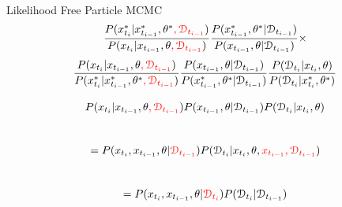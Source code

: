 \documentclass[12pt,a4paper,t,xcolor=dvipsnames,slidestop,compress,mathserif]{beamer}
\newcommand{\red}[1]{{\color{red}#1}}
\begin{document}
\begin{frame}{Likelihood Free Particle MCMC}
$$ \frac{P(x_{t_{i}}^*| x_{t_{i-1}}^*,\theta^*\red{, \mathcal{D}_{t_{i-1}}})}{P(x_{t_{i}}| x_{t_{i-1}}, \theta \red{, \mathcal{D}_{t_{i-1}}})} 
\frac{P(x_{t_{i-1}}^*,\theta^*| \mathcal{D}_{t_{i-1}})}{P(x_{t_{i-1}}, \theta| \mathcal{D}_{t_{i-1}})}
\times $$
$$\frac{P(x_{t_{i}}| x_{t_{i-1}}, \theta \red{, \mathcal{D}_{t_{i-1}}})}{P(x_{t_{i}}^*| x_{t_{i-1}}^*,\theta^*\red{, \mathcal{D}_{t_{i-1}}})}
\frac{ P(x_{t_{i-1}}, \theta| \mathcal{D}_{t_{i-1}})}{ P( x_{t_{i-1}}^*,\theta^*| \mathcal{D}_{t_{i-1}})}   
\frac{P(\mathcal{D}_{t_{i}}|x_{t_{i}}, \theta)}{P(\mathcal{D}_{t_{i}}|x_{t_{i}}^*, \theta^*)}$$  
\pause

$${P(x_{t_{i}}| x_{t_{i-1}}, \theta \red{, \mathcal{D}_{t_{i-1}}})}
{ P(x_{t_{i-1}}, \theta| \mathcal{D}_{t_{i-1}})}
{P(\mathcal{D}_{t_{i}}|x_{t_{i}}, \theta)}$$ \\
\pause
$$={P(x_{t_{i}}, x_{t_{i-1}}, \theta |\red{ \mathcal{D}_{t_{i-1}}})}
{P(\mathcal{D}_{t_{i}}|x_{t_{i}}, \theta, \red{ x_{t_{i-1}},\mathcal{D}_{t_{i-1}}})}$$ \\

$$={P(x_{t_{i}}, x_{t_{i-1}}, \theta |\red{ \mathcal{D}_{t_{i}}})P( \mathcal{D}_{t_{i}}| \mathcal{D}_{t_{i-1}})}$$ \\
\end{frame}
%
%
%

%
%
\end{document}
